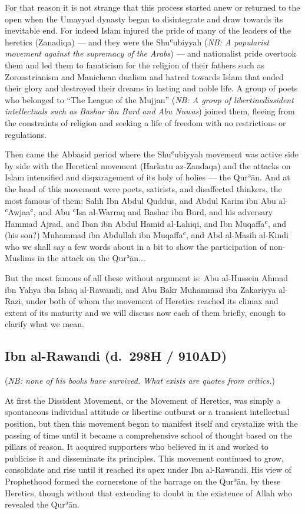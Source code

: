 \documentclass[12pt]{memoir}
\def\´{ʾ} %
\def\`{ʿ} %
\def \Quran{Qur\-\´ān} %
\def\/{\discretionary{/}{}{/}}
\def\–{-\hskip0pt}
\newcommand{\NB}[1]{\emph{\small NB: #1}}
\begin{document}
For that reason it is not strange that this process started anew or returned to
the open when the Umayyad dynasty began to disintegrate and draw towards its
inevitable end. For indeed Islam injured the pride of many of the leaders of
the heretics (Zanadiqa) — and they were the Shu\`ubiyyah
(\NB{A popularist movement against the supremacy of the Arabs})
— and nationalist pride overtook them and led them to fanaticism for the
religion of their fathers such as Zoroastrianism and Manichean dualism and
hatred towards Islam that ended their glory and destroyed their dreams in
lasting and noble life.
A group of poets who belonged to “The League of the Mujjan”
(\NB{A group of libertine\/dissident intellectuals such as Bashar ibn Burd and
Abu Nuwas})
joined them, fleeing from the constraints of religion
and seeking a life of freedom with no restrictions or regulations.

Then came the Abbasid period where the Shu\`ubiyyah movement was active side by
side with the Heretical movement (Harkatu az\–Zandaqa) and the attacks on Islam
intensified and disparagement of its holy of holies — the \Quran. And at the
head of this movement were poets, satirists, and disaffected thinkers, the most
famous of them: Salih Ibn Abdul Quddus, and Abdul Karim ibn Abu al\–\`Awjaa\`,
and Abu \`Isa al\–Warraq and Bashar ibn Burd,
and his adversary Hammad Ajrad, and
Iban ibn Abdul Hamid al\–Lahiqi, and Ibn Muqaffa\`,
and (his son?) Muhammad ibn Abdullah ibn Muqaffa\`,
and Abd al\–Masih al\–Kindi who we shall say a few words
about in a bit to show the participation of non\–Muslims in the attack on the
\Quran...

But the most famous of all these without argument is:
Abu al\–Hussein Ahmad ibn Yahya ibn Ishaq al\–Rawandi,
and Abu Bakr Muhammad ibn Zakariyya al\–Razi,
under both of whom the movement of Heretics reached its climax
and extent of its maturity and we will discuss now each of them briefly,
enough to clarify what we mean.


\subsection{Ibn al-Rawandi (d.\ 298H / 910AD)}

(\NB{none of his books have survived. What exists are quotes from critics.})

At first the Dissident Movement, or the Movement of Heretics, was simply a
spontaneous individual attitude or libertine outburst or a transient
intellectual position, but then this movement began to manifest itself and
crystalize with the passing of time until it became a comprehensive school of
thought based on the pillars of reason. It acquired supporters who believed in
it and worked to publicise it and disseminate its principles.
This movement continued to grow,
consolidate and rise until it reached its apex under Ibn al\–Rawandi.
His view of Prophethood formed the cornerstone of the barrage
on the \Quran, by these Heretics, though without that extending to doubt in the
existence of Allah who revealed the \Quran.
\end{document}
